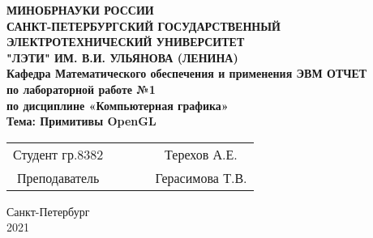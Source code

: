 \begin{titlepage}

\begin{center}
\textbf{
МИНОБРНАУКИ РОССИИ \\
САНКТ-ПЕТЕРБУРГСКИЙ ГОСУДАРСТВЕННЫЙ \\
ЭЛЕКТРОТЕХНИЧЕСКИЙ УНИВЕРСИТЕТ \\
"ЛЭТИ" ИМ. В.И. УЛЬЯНОВА (ЛЕНИНА) \\
Кафедра Математического обеспечения и применения ЭВМ
\vfill
ОТЧЕТ\\
по лабораторной работе №1\\
по дисциплине «Компьютерная графика»\\
Тема: Примитивы OpenGL
\vfill
}
\begin{tabular}{ c c c c c }
 Студент гр.8382 & \hspace{3cm} & \underline{\hspace{4cm}} & \hspace{1cm} & Терехов А.Е. \\
 Преподаватель & \hspace{3cm} & \underline{\hspace{4cm}} & \hspace{1cm} & Герасимова Т.В.
\end{tabular}

\vspace{3cm}

Санкт-Петербург\\
2021
\end{center}

\end{titlepage}
